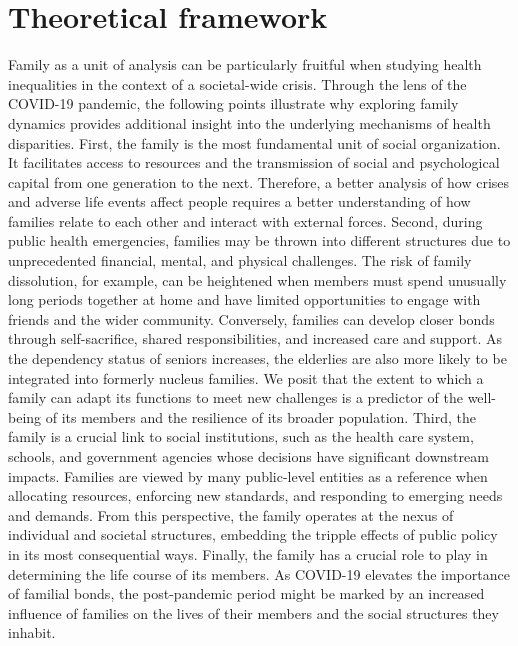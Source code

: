 \documentclass[
]{article}
\begin{document}
\newpage

\hypertarget{theoretical-framework}{%
\section{Theoretical framework}\label{theoretical-framework}}

Family as a unit of analysis can be particularly fruitful when studying health
inequalities in the context of a societal-wide crisis. Through the lens of the
COVID-19 pandemic, the following points illustrate why exploring family dynamics
provides additional insight into the underlying mechanisms of health
disparities. First, the family is the most fundamental unit of social
organization. It facilitates access to resources and the transmission of social
and psychological capital from one generation to the next. Therefore, a better
analysis of how crises and adverse life events affect people requires a better
understanding of how families relate to each other and interact with external
forces. Second, during public health emergencies, families may be thrown into
different structures due to unprecedented financial, mental, and physical
challenges. The risk of family dissolution, for example, can be heightened when
members must spend unusually long periods together at home and have limited
opportunities to engage with friends and the wider community. Conversely,
families can develop closer bonds through self-sacrifice, shared
responsibilities, and increased care and support. As the dependency status of
seniors increases, the elderlies are also more likely to be integrated into
formerly nucleus families. We posit that the extent to which a family can adapt
its functions to meet new challenges is a predictor of the well-being of its
members and the resilience of its broader population. Third, the family is a
crucial link to social institutions, such as the health care system, schools,
and government agencies whose decisions have significant downstream impacts.
Families are viewed by many public-level entities as a reference when allocating
resources, enforcing new standards, and responding to emerging needs and
demands. From this perspective, the family operates at the nexus of individual
and societal structures, embedding the tripple effects of public policy in its
most consequential ways. Finally, the family has a crucial role to play in
determining the life course of its members. As COVID-19 elevates the importance
of familial bonds, the post-pandemic period might be marked by an increased
influence of families on the lives of their members and the social structures
they inhabit.
\end{document}
